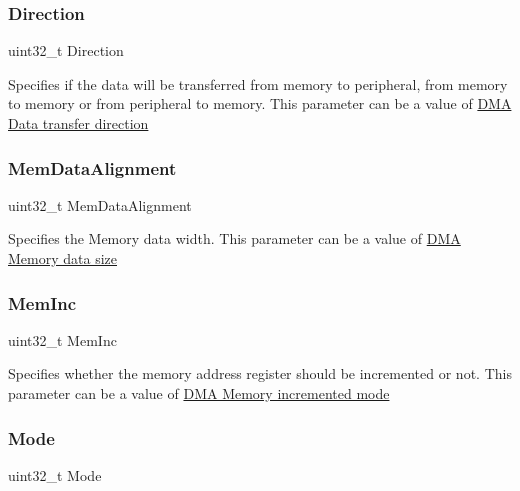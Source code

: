 \subsubsection{\texorpdfstring{Direction}{Direction}}
{\footnotesize\ttfamily uint32\+\_\+t Direction}

Specifies if the data will be transferred from memory to peripheral, from memory to memory or from peripheral to memory. This parameter can be a value of \hyperlink{group___d_m_a___data__transfer__direction}{D\+MA Data transfer direction} \mbox{\label{struct_d_m_a___init_type_def_afe3adac32f5411b1a744c030f398aa5e}} 
\subsubsection{\texorpdfstring{Mem\+Data\+Alignment}{MemDataAlignment}}
{\footnotesize\ttfamily uint32\+\_\+t Mem\+Data\+Alignment}

Specifies the Memory data width. This parameter can be a value of \hyperlink{group___d_m_a___memory__data__size}{D\+MA Memory data size} \mbox{\label{struct_d_m_a___init_type_def_a831756fbcd64feb1e570a9bf743b5b8d}} 
\subsubsection{\texorpdfstring{Mem\+Inc}{MemInc}}
{\footnotesize\ttfamily uint32\+\_\+t Mem\+Inc}

Specifies whether the memory address register should be incremented or not. This parameter can be a value of \hyperlink{group___d_m_a___memory__incremented__mode}{D\+MA Memory incremented mode} \mbox{\label{struct_d_m_a___init_type_def_a0ffc93ec511ed9cf1663f6939bd3e839}} 
\subsubsection{\texorpdfstring{Mode}{Mode}}
{\footnotesize\ttfamily uint32\+\_\+t Mode}

